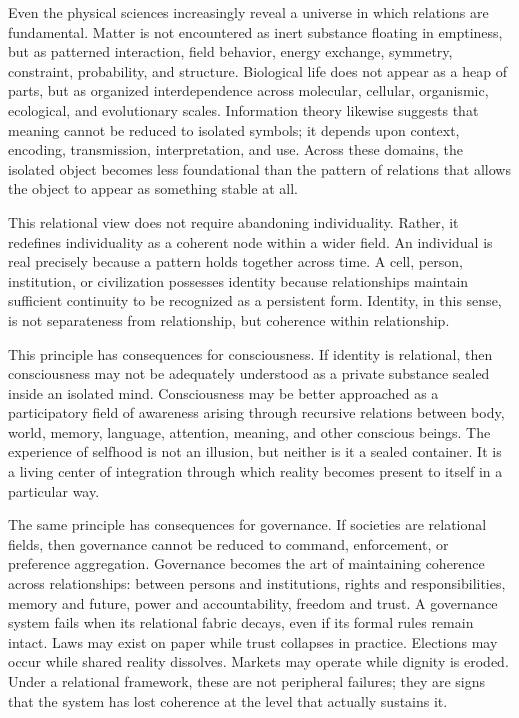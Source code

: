 \documentclass[12pt]{article}
\begin{document}
Even the physical sciences increasingly reveal a universe in which relations are fundamental. Matter is not encountered as inert substance floating in emptiness, but as patterned interaction, field behavior, energy exchange, symmetry, constraint, probability, and structure. Biological life does not appear as a heap of parts, but as organized interdependence across molecular, cellular, organismic, ecological, and evolutionary scales. Information theory likewise suggests that meaning cannot be reduced to isolated symbols; it depends upon context, encoding, transmission, interpretation, and use. Across these domains, the isolated object becomes less foundational than the pattern of relations that allows the object to appear as something stable at all.

This relational view does not require abandoning individuality. Rather, it redefines individuality as a coherent node within a wider field. An individual is real precisely because a pattern holds together across time. A cell, person, institution, or civilization possesses identity because relationships maintain sufficient continuity to be recognized as a persistent form. Identity, in this sense, is not separateness from relationship, but coherence within relationship.


This principle has consequences for consciousness. If identity is relational, then consciousness may not be adequately understood as a private substance sealed inside an isolated mind. Consciousness may be better approached as a participatory field of awareness arising through recursive relations between body, world, memory, language, attention, meaning, and other conscious beings. The experience of selfhood is not an illusion, but neither is it a sealed container. It is a living center of integration through which reality becomes present to itself in a particular way.

The same principle has consequences for governance. If societies are relational fields, then governance cannot be reduced to command, enforcement, or preference aggregation. Governance becomes the art of maintaining coherence across relationships: between persons and institutions, rights and responsibilities, memory and future, power and accountability, freedom and trust. A governance system fails when its relational fabric decays, even if its formal rules remain intact. Laws may exist on paper while trust collapses in practice. Elections may occur while shared reality dissolves. Markets may operate while dignity is eroded. Under a relational framework, these are not peripheral failures; they are signs that the system has lost coherence at the level that actually sustains it.
\end{document}
